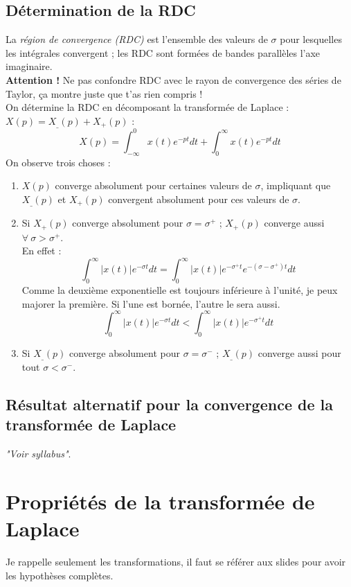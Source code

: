 \subsection{Détermination de la RDC}
La \textit{région de convergence (RDC)} est l'ensemble des valeurs de $\sigma$ 
pour lesquelles les intégrales convergent ; les RDC sont formées de bandes 
parallèles  l'axe imaginaire.\\
\textbf{Attention !} Ne pas confondre RDC avec le rayon de convergence des 
séries de Taylor, ça montre juste que t'as rien compris !\\
On détermine la RDC en décomposant la transformée de Laplace : $X(p) = X_\_(p)+
X_+(p)$ :
\begin{equation}
	X(p) = \int_{-\infty}^0 x(t)e^{-pt}dt + \int_0^\infty x(t)e^{-pt}dt
\end{equation}
On observe trois choses :
\begin{enumerate}
	\item $X(p)$ converge absolument pour certaines valeurs de $\sigma$, impliquant 
	      que $X_\_(p)$ et  $X_+(p)$ convergent absolument pour ces valeurs de $\sigma$.
	\item Si $X_+(p)$ converge absolument pour $\sigma=\sigma^+$ ; $X_+(p)$ converge aussi
	      $\forall\ \sigma>\sigma^+$.\\
	      En effet : 
	      \begin{equation}
	      	\int_0^\infty |x(t)|e^{-\sigma t}dt = \int_0^\infty |x(t)|e^{-\sigma^+t}e^{-
	      		(\sigma-\sigma^+)t} dt
	      \end{equation}
	      Comme la deuxième exponentielle est toujours inférieure à l'unité, je peux 
	      majorer la première. Si l'une est bornée, l'autre le sera aussi.
	      \begin{equation}
	      	\int_0^\infty |x(t)|e^{-\sigma t}dt < \int_0^\infty |x(t)|e^{-\sigma^+t}dt
	      \end{equation}
	\item Si $X_\_(p)$ converge absolument pour $\sigma = \sigma^-$ ; $X_\_(p)$ converge aussi  
	      pour tout $\sigma < \sigma^-$.
\end{enumerate}


\subsection{Résultat alternatif pour la convergence de la transformée de Laplace}
\textit{"Voir syllabus"}.


\section{Propriétés de la transformée de Laplace}
Je rappelle seulement les transformations, il faut se référer aux slides pour avoir
les hypothèses complètes.
